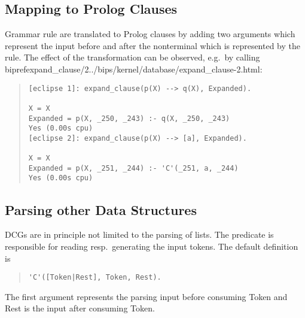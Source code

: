 \subsection{Mapping to Prolog Clauses}
Grammar rule are translated to Prolog clauses by adding two arguments
which represent the input before and after the nonterminal which is
represented by the rule.
The effect of the transformation can be observed, e.g.\ by calling bipref{expand_clause/2}{../bips/kernel/database/expand_clause-2.html}:
\begin{quote} \begin{verbatim}
[eclipse 1]: expand_clause(p(X) --> q(X), Expanded).

X = X
Expanded = p(X, _250, _243) :- q(X, _250, _243)
Yes (0.00s cpu)
[eclipse 2]: expand_clause(p(X) --> [a], Expanded).

X = X
Expanded = p(X, _251, _244) :- 'C'(_251, a, _244)
Yes (0.00s cpu)
\end{verbatim} \end{quote}

\subsection{Parsing other Data Structures}

DCGs are in principle not limited to the parsing of lists.
The predicate  is responsible for reading resp.\ generating
the input tokens. The default definition is
\begin{quote}\begin{verbatim}
'C'([Token|Rest], Token, Rest).
\end{verbatim}\end{quote}
The first argument represents the parsing input before consuming
Token and Rest is the input after consuming Token.


